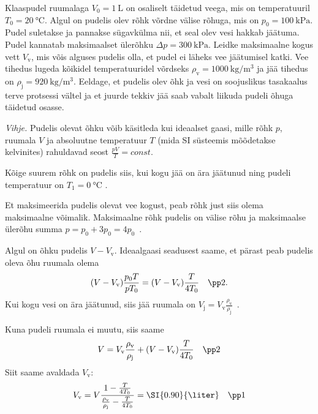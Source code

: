 
Klaaspudel ruumalaga $V_0=\SI{1}{\liter}$ on osaliselt täidetud veega, mis on temperatuuril $T_0=\SI{20}{\celsius}$. Algul on pudelis olev rõhk võrdne välise rõhuga, mis on $p_0=\SI{100}{\kilo\pascal}$. Pudel suletakse ja pannakse sügavkülma nii, et seal olev vesi hakkab jäätuma. Pudel kannatab maksimaalset ülerõhku $\Delta p=\SI{300}{\kilo\pascal}$. Leidke maksimaalne kogus vett $V_{\text{v}}$, mis võis alguses pudelis olla, et pudel ei läheks vee jäätumisel katki. Vee tihedus lugeda kõikidel temperatuuridel võrdseks $\rho_{\text{v}}=\SI{1000}{\kilo\gram\per\meter\cubed}$ ja jää tihedus on $\rho_{\text{j}}=\SI{920}{\kilo\gram\per\meter\cubed}$. Eeldage, et pudelis olev õhk ja vesi on soojuslikus tasakaalus terve protsessi vältel ja et juurde tekkiv jää saab vabalt liikuda pudeli õhuga täidetud osasse.

\emph{Vihje.} Pudelis olevat õhku võib käsitleda kui ideaalset gaasi, mille rõhk $p$, ruumala $V$ ja absoluutne temperatuur $T$ (mida SI süsteemis mõõdetakse kelvinites) rahuldavad seost $\tfrac{pV}{T}=\textit{const}$.


\hint

\solu
Kõige suurem rõhk on pudelis siis, kui kogu jää on ära jäätunud ning pudeli temperatuur on $T_1=\SI{0}{\celsius}$ . \par
Et maksimeerida pudelis olevat vee kogust, peab rõhk just siis olema maksimaalne võimalik. Maksimaalne rõhk pudelis on välise rõhu ja maksimaalse ülerõhu summa $p=p_0+3p_0=4p_0$~. \par
Algul on õhku pudelis $V-V_{\text{v}}$. Ideaalgaasi seadusest saame, et pärast peab pudelis oleva õhu ruumala olema
$$(V-V_{\text{v}})\frac{p_0T}{pT_0}=(V-V_{\text{v}}) \frac{T}{4T_0} \quad \pp2.$$
Kui kogu vesi on ära jäätunud, siis jää ruumala on $V_{\text{j}}=V_{\text{v}}\frac{\rho_{\text{v}}}{\rho_{\text{j}}}$~. \par
Kuna pudeli ruumala ei muutu, siis saame
$$V=V_{\text{v}}\frac{\rho_{\text{v}}}{\rho_{\text{j}}} + (V-V_{\text{v}}) \frac{T}{4T_0} \quad \pp2$$
Siit saame avaldada $V_{\text{v}}$:
$$V_{\text{v}}=V \frac{1-\frac{T}{4T_0}}{\frac{\rho_{\text{v}}}{\rho_{\text{j}}}-\frac{T}{4T_0}} = \SI{0.90}{\liter} \quad \pp1$$
\probend